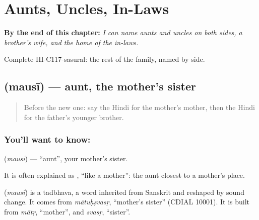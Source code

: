 
\chapter{Aunts, Uncles, In-Laws}
\label{ch:hi-aunts-uncles}

\begin{chapteropening}
\textbf{By the end of this chapter:} \emph{I can name aunts and uncles on both sides, a brother's wife, and the home of the in-laws.}

Complete HI-C117-sasural: the rest of the family, named by side.
\end{chapteropening}

\section[\texorpdfstring{\hi{मौसी} (mausī)}{मौसी (mausī)}]{ (mausī) — aunt, the mother's sister}

\label{lesson:HI-C117-mausi}



\begin{quote}
Before the new one: say the Hindi for the mother's mother, then the Hindi for the father's younger brother.
\end{quote}

\subsection*{You'll want to know: }
\textbf{} (\emph{mausī}) — \textquotedblleft{}aunt\textquotedblright{}, your mother's sister.

It is often explained as \textbf{ }, \textquotedblleft{}like a mother\textquotedblright{}: the aunt closest to a mother's place.

\begin{cousinweb}
\textbf{} (\emph{mausī}) is a tadbhava, a word inherited from Sanskrit and reshaped by sound change. It comes from \emph{mātuḥṣvasṛ}, \textquotedblleft{}mother's sister\textquotedblright{} (CDIAL 10001). It is built from \emph{mātṛ}, \textquotedblleft{}mother\textquotedblright{}, and \emph{svasṛ}, \textquotedblleft{}sister\textquotedblright{}.
\end{cousinweb}

